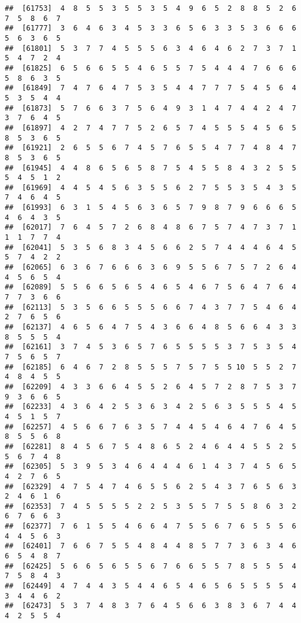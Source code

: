 \documentclass[
]{book}
\begin{document}
\begin{verbatim}
##  [61753]  4  8  5  5  3  5  5  3  5  4  9  6  5  2  8  8  5  2  6  7  5  8  6  7
##  [61777]  3  6  4  6  3  4  5  3  3  6  5  6  3  3  5  3  6  6  6  5  6  3  6  5
##  [61801]  5  3  7  7  4  5  5  5  6  3  4  6  4  6  2  7  3  7  1  5  4  7  2  4
##  [61825]  6  5  6  6  5  5  4  6  5  5  7  5  4  4  4  7  6  6  6  5  8  6  3  5
##  [61849]  7  4  7  6  4  7  5  3  5  4  4  7  7  7  5  4  5  6  4  5  3  5  4  4
##  [61873]  5  7  6  6  3  7  5  6  4  9  3  1  4  7  4  4  2  4  7  3  7  6  4  5
##  [61897]  4  2  7  4  7  7  5  2  6  5  7  4  5  5  5  4  5  6  5  8  5  3  6  5
##  [61921]  2  6  5  5  6  7  4  5  7  6  5  5  4  7  7  4  8  4  7  8  5  3  6  5
##  [61945]  4  4  8  6  5  6  5  8  7  5  4  5  5  8  4  3  2  5  5  5  4  5  1  2
##  [61969]  4  4  5  4  5  6  3  5  5  6  2  7  5  5  3  5  4  3  5  7  4  6  4  5
##  [61993]  6  3  1  5  4  5  6  3  6  5  7  9  8  7  9  6  6  6  5  4  6  4  3  5
##  [62017]  7  6  4  5  7  2  6  8  4  8  6  7  5  7  4  7  3  7  1  1  1  7  7  4
##  [62041]  5  3  5  6  8  3  4  5  6  6  2  5  7  4  4  4  6  4  5  5  7  4  2  2
##  [62065]  6  3  6  7  6  6  6  3  6  9  5  5  6  7  5  7  2  6  4  4  5  6  5  4
##  [62089]  5  5  6  6  5  6  5  4  6  5  4  6  7  5  6  4  7  6  4  7  7  3  6  6
##  [62113]  5  3  5  6  6  5  5  5  6  6  7  4  3  7  7  5  4  6  4  2  7  6  5  6
##  [62137]  4  6  5  6  4  7  5  4  3  6  6  4  8  5  6  6  4  3  3  8  5  5  5  4
##  [62161]  3  7  4  5  3  6  5  7  6  5  5  5  5  3  7  5  3  5  4  7  5  6  5  7
##  [62185]  6  4  6  7  2  8  5  5  5  7  5  7  5  5 10  5  5  2  7  4  8  4  5  5
##  [62209]  4  3  3  6  6  4  5  5  2  6  4  5  7  2  8  7  5  3  7  9  3  6  6  5
##  [62233]  4  3  6  4  2  5  3  6  3  4  2  5  6  3  5  5  5  4  5  4  5  1  5  7
##  [62257]  4  5  6  6  7  6  3  5  7  4  4  5  4  6  4  7  6  4  5  8  5  5  6  8
##  [62281]  8  4  5  6  7  5  4  8  6  5  2  4  6  4  4  5  5  2  5  5  6  7  4  8
##  [62305]  5  3  9  5  3  4  6  4  4  4  6  1  4  3  7  4  5  6  5  4  2  7  6  5
##  [62329]  4  7  5  4  7  4  6  5  5  6  2  5  4  3  7  6  5  6  3  2  4  6  1  6
##  [62353]  7  4  5  5  5  5  2  2  5  3  5  5  7  5  5  8  6  3  2  6  7  6  6  3
##  [62377]  7  6  1  5  5  4  6  6  4  7  5  5  6  7  6  5  5  5  6  4  4  5  6  3
##  [62401]  7  6  6  7  5  5  4  8  4  4  8  5  7  7  3  6  3  4  6  6  5  4  8  7
##  [62425]  5  6  6  5  6  5  5  6  7  6  6  5  5  7  8  5  5  5  4  7  5  8  4  3
##  [62449]  4  7  4  4  3  5  4  4  6  5  4  6  5  6  5  5  5  5  4  3  4  4  6  2
##  [62473]  5  3  7  4  8  3  7  6  4  5  6  6  3  8  3  6  7  4  4  4  2  5  5  4

\end{verbatim}
\end{document}

